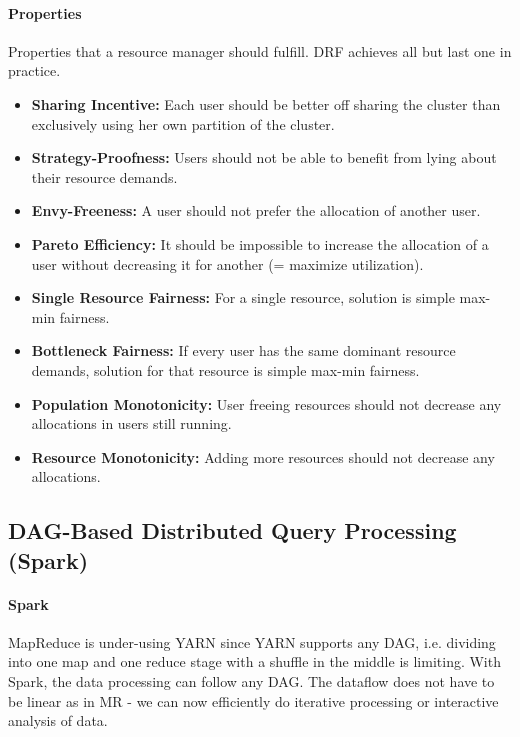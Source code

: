 \paragraph{Properties}
Properties that a resource manager should fulfill. DRF achieves all but last one in practice.
\begin{itemize}
    \item \textbf{Sharing Incentive:} Each user should be better off sharing the cluster than exclusively using her own partition of the cluster.
    \item \textbf{Strategy-Proofness:} Users should not be able to benefit from lying about their resource demands.
    \item \textbf{Envy-Freeness:} A user should not prefer the allocation of another user.
    \item \textbf{Pareto Efficiency:} It should be impossible to increase the allocation of a user without decreasing it for another (= maximize utilization).
    \item \textbf{Single Resource Fairness:} For a single resource, solution is simple max-min fairness.
    \item \textbf{Bottleneck Fairness:} If every user has the same dominant resource demands, solution for that resource is simple max-min fairness.
    \item \textbf{Population Monotonicity:} User freeing resources should not decrease any allocations in users still running.
    \item \textbf{Resource Monotonicity:} Adding more resources should not decrease any allocations.
\end{itemize}








\subsection{DAG-Based Distributed Query Processing (Spark)}

\paragraph{Spark}
MapReduce is under-using YARN since YARN supports any DAG, i.e. dividing into one map and one reduce stage with a shuffle in the middle is limiting. With Spark, the data processing can follow any DAG. The dataflow does not have to be linear as in MR - we can now efficiently do iterative processing or interactive analysis of data.

